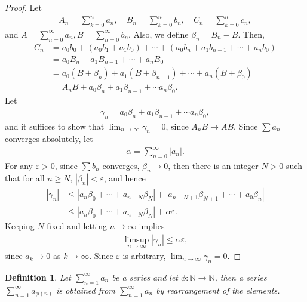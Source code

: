 \documentclass[11pt]{book}
\newtheorem{definition}{Definition}[chapter]
\theoremstyle{definition}
\numberwithin{equation}{chapter}
\begin{document}
\begin{proof}
Let
\begin{align*}
    A_n = \sum^n_{k=0} a_n, \quad B_n = \sum^n_{k=0} b_n, \quad C_n = \sum^n_{k=0} c_n, 
\end{align*}
and $A = \sum^\infty_{n=0} a_n, B = \sum^\infty_{n=0} b_n$. Also, we define $\beta_n = B_n - B$. Then,
\begin{align*}
    C_n & = a_0b_0 + (a_0b_1 + a_1b_0) + \cdots + (a_0b_n + a_1b_{n-1} + \cdots + a_nb_0) \\
    & = a_0 B_n + a_1 B_{n-1} + \cdots + a_n B_0 \\
    & = a_0 (B + \beta_n) + a_1 (B + \beta_{n-1}) + \cdots + a_n (B + \beta_0) \\
    & = A_n B + a_0 \beta_n + a_1 \beta_{n-1} + \cdots a_n \beta_0.
\end{align*}
Let
\begin{align*}
    \gamma_n = a_0 \beta_n + a_1 \beta_{n-1} + \cdots a_n \beta_0,
\end{align*}
and it suffices to show that $\lim_{n\to\infty} \gamma_n = 0$, since $A_nB \to AB$. Since $\sum a_n$ converges absolutely, let
\begin{align*}
    \alpha = \sum^\infty_{n=0} \left|a_n\right|.
\end{align*}
For any $\varepsilon > 0$, since $\sum b_n$ converges, $\beta_n \to 0$, then there is an integer $N > 0$ such that for all $n \geq N$, $\left|\beta_n\right| < \varepsilon$, and hence
\begin{align*}
    \left|\gamma_n\right| & \leq \left|a_n \beta_0 + \cdots + a_{n-N} \beta_N\right| + \left|a_{n-N+1} \beta_{N+1} + \cdots + a_0 \beta_n\right| \\
    & \leq \left|a_n \beta_0 + \cdots + a_{n-N} \beta_N\right| + \alpha \varepsilon.
\end{align*}
Keeping $N$ fixed and letting $n \to \infty$ implies
\begin{align*}
    \limsup_{n\to\infty} \left|\gamma_n\right| \leq \alpha \varepsilon,
\end{align*}
since $a_k \to 0$ as $k \to \infty$. Since $\varepsilon$ is arbitrary, $\lim_{n\to\infty} \gamma_n = 0$.
\end{proof}

\medskip

\begin{definition}
Let $\sum^\infty_{n=1} a_n$ be a series and let $\phi: \mathbb{N} \to \mathbb{N}$, then a series $\sum^\infty_{n=1} a_{\phi(n)}$ is obtained from $\sum^\infty_{n=1} a_n$ by rearrangement of the elements. 
\end{definition}
\end{document}
